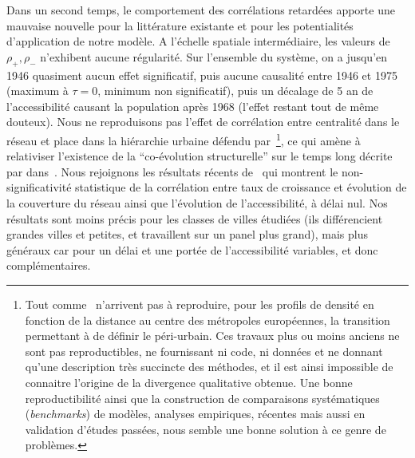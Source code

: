 Dans un second temps, le comportement des corrélations retardées apporte une mauvaise nouvelle pour la littérature existante et pour les potentialités d'application de notre modèle. A l'échelle spatiale intermédiaire, les valeurs de $\rho_+,\rho_-$ n'exhibent aucune régularité. Sur l'ensemble du système, on a jusqu'en 1946 quasiment aucun effet significatif, puis aucune causalité entre 1946 et 1975 (maximum à $\tau = 0$, minimum non significatif), puis un décalage de 5 an de l'accessibilité causant la population après 1968 (l'effet restant tout de même douteux). Nous ne reproduisons pas l'effet de corrélation entre centralité dans le réseau et place dans la hiérarchie urbaine défendu par~\cite{bretagnolle2003vitesse}\footnote{Tout comme~\cite{lemoy2017scaling} n'arrivent pas à reproduire, pour les profils de densité en fonction de la distance au centre des métropoles européennes, la transition permettant à \cite{guerois2008built} de définir le péri-urbain. Ces travaux plus ou moins anciens ne sont pas reproductibles, ne fournissant ni code, ni données et ne donnant qu'une description très succincte des méthodes, et il est ainsi impossible de connaitre l'origine de la divergence qualitative obtenue. Une bonne reproductibilité ainsi que la construction de comparaisons systématiques (\emph{benchmarks}) de modèles, analyses empiriques, récentes mais aussi en validation d'études passées, nous semble une bonne solution à ce genre de problèmes.}, ce qui amène à relativiser l'existence de la ``co-évolution structurelle'' sur le temps long décrite par  dans~\cite{espacegeo2014effets}. Nous rejoignons les résultats récents de~\cite{mimeur:hal-01616746} qui montrent le non-significativité statistique de la corrélation entre taux de croissance et évolution de la couverture du réseau ainsi que l'évolution de l'accessibilité, à délai nul. Nos résultats sont moins précis pour les classes de villes étudiées (ils différencient grandes villes et petites, et travaillent sur un panel plus grand), mais plus généraux car pour un délai et une portée de l'accessibilité variables, et donc complémentaires.






